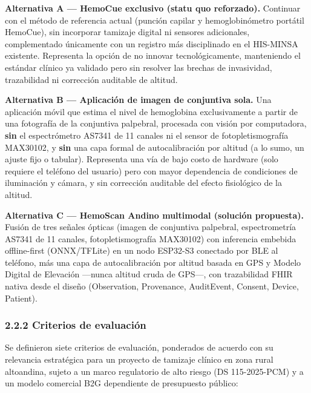 \documentclass[11pt,a4paper]{article}
\begin{document}
\textbf{Alternativa A --- HemoCue exclusivo (statu quo reforzado).} Continuar con el método de referencia actual (punción capilar y hemoglobinómetro portátil HemoCue), sin incorporar tamizaje digital ni sensores adicionales, complementado únicamente con un registro más disciplinado en el HIS-MINSA existente. Representa la opción de no innovar tecnológicamente, manteniendo el estándar clínico ya validado pero sin resolver las brechas de invasividad, trazabilidad ni corrección auditable de altitud.

\textbf{Alternativa B --- Aplicación de imagen de conjuntiva sola.} Una aplicación móvil que estima el nivel de hemoglobina exclusivamente a partir de una fotografía de la conjuntiva palpebral, procesada con visión por computadora, \textbf{sin} el espectrómetro AS7341 de 11 canales ni el sensor de fotopletismografía MAX30102, y \textbf{sin} una capa formal de autocalibración por altitud (a lo sumo, un ajuste fijo o tabular). Representa una vía de bajo costo de hardware (solo requiere el teléfono del usuario) pero con mayor dependencia de condiciones de iluminación y cámara, y sin corrección auditable del efecto fisiológico de la altitud.

\textbf{Alternativa C --- HemoScan Andino multimodal (solución propuesta).} Fusión de tres señales ópticas (imagen de conjuntiva palpebral, espectrometría AS7341 de 11 canales, fotopletismografía MAX30102) con inferencia embebida offline-first (ONNX/TFLite) en un nodo ESP32-S3 conectado por BLE al teléfono, más una capa de autocalibración por altitud basada en GPS y Modelo Digital de Elevación ---nunca altitud cruda de GPS---, con trazabilidad FHIR nativa desde el diseño (Observation, Provenance, AuditEvent, Consent, Device, Patient).

\subsubsection{2.2.2 Criterios de evaluación}\label{criterios-de-evaluaciuxf3n}

Se definieron siete criterios de evaluación, ponderados de acuerdo con su relevancia estratégica para un proyecto de tamizaje clínico en zona rural altoandina, sujeto a un marco regulatorio de alto riesgo (DS 115-2025-PCM) y a un modelo comercial B2G dependiente de presupuesto público:
\end{document}
